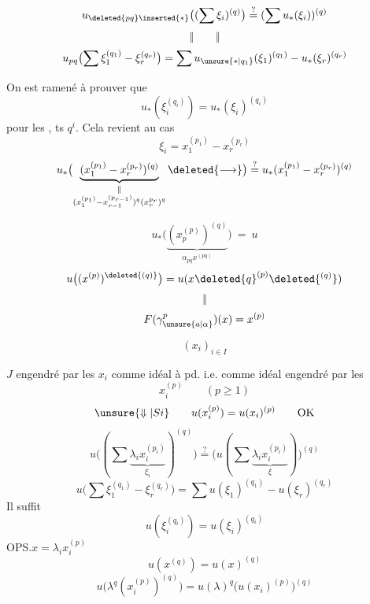 
\[
u_{\deleted{pq}\inserted{*}}\bigl((\sum\xi_i)^{(q)}\bigr)
\overset{?}{=}(\sum u_*(\xi_i))^{(q)}
\]
\[\Vert\qquad\Vert\]
\[
u_{pq}\bigl(\sum\xi_1^{(q_1)}-\xi_r^{(q_r)}\bigr)
=\sum u_{\unsure{*|q_1}}(\xi_1)^{(q_1)}-u_*(\xi_r)^{(q_r)}
\]

On est ramené à prouver que
\[
u_*(\xi_i^{(q_i)})=u_*(\xi_i)^{(q_i)}
\]
pour les , ts $q^i$.
Cela revient au cas
\[
\xi_i=x_1^{(p_1)}-x_r^{(p_r)}
\]
\[
u_*\bigl(\underbrace{(x_1^{(p_1)}-x_r^{(p_r)})^{(q)}}_{\substack{\Vert\\(x_1^{(p_1)}-x_{r-1}^{(p_{r-1})})^q(x_r^{p_r})^q}}\deleted{\longrightarrow}\bigr)
\overset{?}{=}u_*(x_1^{(p_1)}-x_r^{(p_r)})^{(q)}
\]

\[
u_*\bigl(\underbrace{(x_{p}^{(p)})^{(q)}}_{\alpha_{pq}x^{(pq)}}\bigr)\ =\ u
\]
\[
u\bigl((x^{(p)})^{\deleted{(q)}}\bigr)
=u(x\deleted{q}^{(p)}\deleted{^{(q)}})
\]
\[\Vert\]
\[
F(\gamma_{\unsure{a|\alpha}}^p)(x)=x^{(p)}
\]

\[(x_i)_{i\in I}\]

$J$ engendré par les $x_i$ comme idéal à pd.
i.e. comme idéal engendré par les
\[
x_i^{(p)}\qquad(p\geq1)
\]
\[
\unsure{\Downarrow|Si}\qquad u(x_i^{(p)})=u(x_i)^{(p)}\qquad\mathrm{OK}
\]
\[
u\bigl((\sum\underbrace{\lambda_i x_i^{(p_i)}}_{\xi_i})^{(q)}\bigr)
\overset{?}{=}\bigl(u(\sum\underbrace{\lambda_i x_i^{(p_i)}}_{\xi})\bigr)^{(q)}
\]
\[
u\bigl(\sum\xi_1^{(q_1)}-\xi_r^{(q_r)}\bigr)
=\sum u(\xi_1)^{(q_1)}-u(\xi_r)^{(q_r)}
\]
Il suffit
\[
u(\xi_i^{(q_i)})=u(\xi_i)^{(q_i)}
\]
OPS.\quad $x=\lambda_i x_i^{(p)}$
\[
u(x^{(q)})=u(x)^{(q)}
\]
\[
u\bigl(\lambda^q(x_i^{(p)})^{(q)}\bigr)
=u(\lambda)^q\bigl(u(x_i)^{(p)}\bigr)^{(q)}
\]

